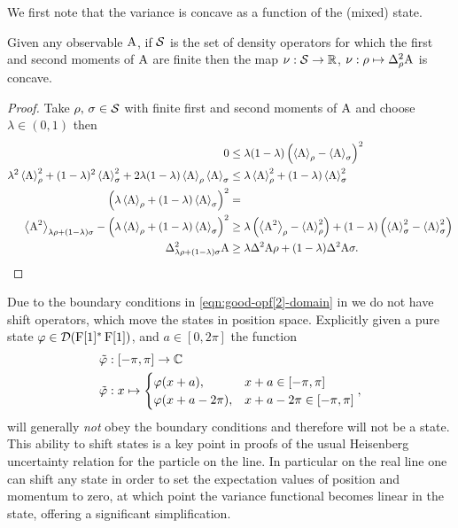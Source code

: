 We first note that the variance is concave as a function of the (mixed) state.
\begin{lem}
  Given any observable $\operatorname{A}$, if $\dops$ is the set of density operators for which the first and second moments of $\operatorname{A}$ are finite then the map $\nu:\dops\to \R$, $\nu:\rho\mapsto \varr{\opa}$ is concave.
\end{lem}
\begin{proof}
  Take $\rho,\, \sigma \in \dops$ with finite first and second moments of $\operatorname{A}$ and choose $\lambda \in (0,1)$ then
  \begin{align}
    0&\leq \lambda(1-\lambda) \left(\expe{\opa}{\rho} - \expe{\opa}{\sigma}\right)^2\\
    \lambda^2 \expe{\opa}{\rho}^2 + (1- \lambda)^2\expe{\opa}{\sigma}^2 + 2\lambda(1-\lambda)\expe{\opa}{\rho}\expe{\opa}{\sigma} &\leq \lambda \expe{\opa}{\rho}^2 + (1-\lambda) \expe{\opa}{\sigma}^2\\
    \left(\lambda \expe{\opa}{\rho} + (1- \lambda)\expe{\opa}{\sigma}\right)^2 &=\\
    \expe{\opa^2}{\lambda\rho + (1-\lambda)\sigma} - \left(\lambda \expe{\opa}{\rho} + (1- \lambda)\expe{\opa}{\sigma}\right)^2 &\geq \lambda\left(\expe{\opa^2}{\rho} -\expe{\opa}{\rho}^2\right) + (1-\lambda)\left(\expe{\opa}{\sigma}^2 -\expe{\opa}{\sigma}^2\right)\\
    \var[\lambda\rho + (1-\lambda)\sigma]{\opa} &\geq \lambda \var{\opa}{\rho} + (1-\lambda ) \var{\opa}{\sigma}.
  \end{align}
\end{proof}



Due to the boundary conditions in \eqref{eqn:good-opf[2]-domain} in we do not have shift operators, which move the states in position space. Explicitly given a pure state $\varphi\in\mathcal{D}(\operatorname{F}[1]^*\operatorname{F}[1])$, and $a\in [0,2\pi] $ the function
\begin{align}
  \tilde{\varphi}&:[-\pi,\pi]\to \mathbb{C}\\
  \tilde{\varphi}&:x\mapsto \begin{cases}\varphi(x+a), & x+a\in [-\pi,\pi]\\ \varphi(x+a-2\pi), & x+a-2\pi\in [-\pi,\pi]\end{cases},
\end{align}
will generally \emph{not} obey the boundary conditions and therefore will not be a state. This ability to shift states is a key point in proofs of the usual Heisenberg uncertainty relation for the particle on the line. In particular on the real line one can shift any state in order to set the expectation values of position and momentum to zero, at which point the variance functional becomes linear in the state, offering a significant simplification.


